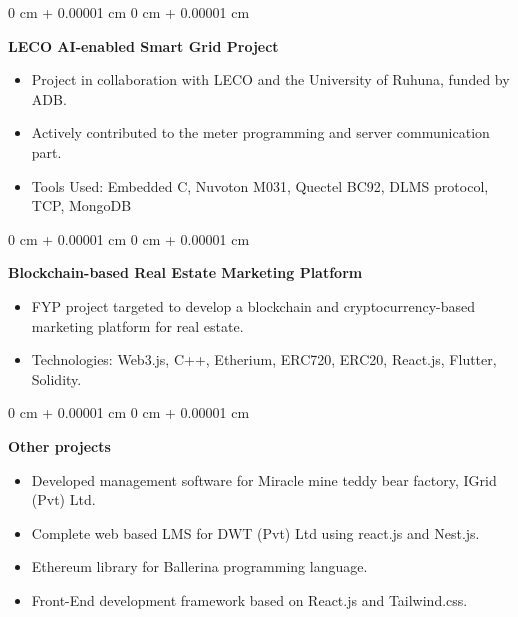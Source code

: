 \documentclass[10pt, letterpaper]{article}
\newenvironment{highlights}{
    \begin{itemize}[
        topsep=0.10 cm,
        parsep=0.10 cm,
        partopsep=0pt,
        itemsep=0pt,
        leftmargin=0 cm + 10pt
    ]
}{
    \end{itemize}
} %
\newenvironment{onecolentry}{
    \begin{adjustwidth}{
        0 cm + 0.00001 cm
    }{
        0 cm + 0.00001 cm
    }
}{
    \end{adjustwidth}
} %
\begin{document}
    \vspace{0.2 cm}

    \begin{onecolentry}
            \textbf{LECO AI-enabled Smart Grid Project}

    \vspace{0.10 cm}
        \begin{highlights}
            \item Project in collaboration with LECO and the University of Ruhuna, funded by ADB.
            \item Actively contributed to the meter programming and server communication part.
            \item Tools Used: Embedded C, Nuvoton M031, Quectel BC92, DLMS protocol, TCP, MongoDB
        \end{highlights}
    \end{onecolentry}

    \vspace{0.2 cm}

    \vspace{0.2 cm}
    \begin{onecolentry}
            \textbf{Blockchain-based Real Estate Marketing Platform}
    \vspace{0.10 cm}
        \begin{highlights}
            \item FYP project targeted to develop a blockchain and cryptocurrency-based marketing platform for real estate.
            \item Technologies: Web3.js, C++, Etherium, ERC720, ERC20, React.js, Flutter, Solidity.
        \end{highlights}
    \end{onecolentry}

        \vspace{0.2 cm}
    \begin{onecolentry}
            \textbf{Other projects}
    \vspace{0.10 cm}
        \begin{highlights}
            \item Developed management software for Miracle mine teddy bear factory, IGrid (Pvt) Ltd.
            \item Complete web based LMS for DWT (Pvt) Ltd using react.js and Nest.js.
            \item Ethereum library for Ballerina programming language.
            \item Front-End development framework based on React.js and Tailwind.css.
        \end{highlights}
    \end{onecolentry}
\end{document}
